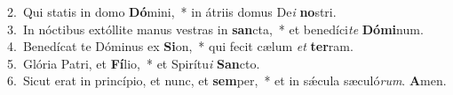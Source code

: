 {2.~}Qui statis in domo \textbf{Dó}mini,~* in átriis domus De\textit{i} \textbf{no}stri.\\
{3.~}In nóctibus extóllite manus vestras in \textbf{san}cta,~* et benedíci\textit{te} \textbf{Dó}\textbf{mi}num.\\
{4.~}Benedícat te Dóminus ex \textbf{Si}on,~* qui fecit cælum \textit{et} \textbf{ter}ram.\\
{5.~}Glória Patri, et \textbf{Fí}lio,~* et Spirítu\textit{i} \textbf{San}cto.\\
{6.~}Sicut erat in princípio, et nunc, et \textbf{sem}per,~* et in sǽcula sæculó\textit{rum}. \textbf{A}men.\\
